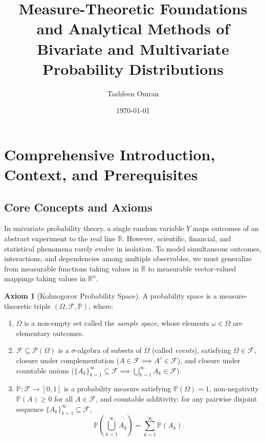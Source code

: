 \documentclass[11pt, letterpaper]{article}
\title{Measure-Theoretic Foundations and Analytical Methods of Bivariate and Multivariate Probability Distributions}
\author{Tashfeen Omran}
\date{\today}
\theoremstyle{definition}
\newtheorem{axiom}{Axiom}[section]
\theoremstyle{remark}
\begin{document}
\maketitle
\tableofcontents
\newpage

\section{Comprehensive Introduction, Context, and Prerequisites}

\subsection{Core Concepts and Axioms}

In univariate probability theory, a single random variable $Y$ maps outcomes of an abstract experiment to the real line $\mathbb{R}$. However, scientific, financial, and statistical phenomena rarely evolve in isolation. To model simultaneous outcomes, interactions, and dependencies among multiple observables, we must generalize from measurable functions taking values in $\mathbb{R}$ to measurable vector-valued mappings taking values in $\mathbb{R}^n$.

\begin{axiom}[Kolmogorov Probability Space]
A probability space is a measure-theoretic triple $(\Omega, \mathcal{F}, \mathbb{P})$, where:
\begin{enumerate}[label=(\roman*)]
    \item $\Omega$ is a non-empty set called the \emph{sample space}, whose elements $\omega \in \Omega$ are elementary outcomes.
    \item $\mathcal{F} \subseteq \mathcal{P}(\Omega)$ is a $\sigma$-algebra of subsets of $\Omega$ (called \emph{events}), satisfying $\Omega \in \mathcal{F}$, closure under complementation ($A \in \mathcal{F} \implies A^c \in \mathcal{F}$), and closure under countable unions ($\{A_k\}_{k=1}^\infty \subseteq \mathcal{F} \implies \bigcup_{k=1}^\infty A_k \in \mathcal{F}$).
    \item $\mathbb{P} : \mathcal{F} \to [0, 1]$ is a probability measure satisfying $\mathbb{P}(\Omega) = 1$, non-negativity $\mathbb{P}(A) \ge 0$ for all $A \in \mathcal{F}$, and countable additivity: for any pairwise disjoint sequence $\{A_k\}_{k=1}^\infty \subseteq \mathcal{F}$,
    \[
        \mathbb{P}\!\left(\bigcup_{k=1}^\infty A_k\right) = \sum_{k=1}^\infty \mathbb{P}(A_k).
    \]
\end{enumerate}
\end{axiom}
\end{document}
